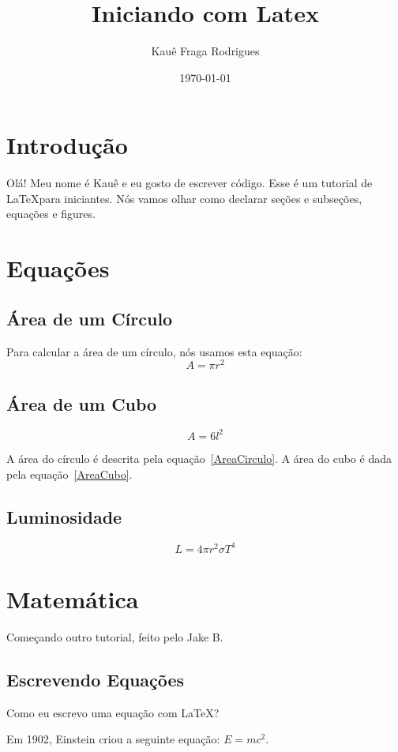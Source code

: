\documentclass[a4paper, 12pt]{article}
\title{\vspace{-3.5cm}\huge{Iniciando com Latex}}
\author{\vspace{-3mm}Kauê Fraga Rodrigues}
\date{\vspace{-0.5cm}\today}
\begin{document}
\maketitle

\section{Introdução} %
Olá! Meu nome é Kauê e eu gosto de escrever código.
Esse é um tutorial de \LaTeX para iniciantes. Nós vamos olhar como declarar
seções e subseções, equações e figures.

\section{Equações}
\subsection{Área de um Círculo}
Para calcular a área de um círculo, nós usamos esta equação:
\begin{equation}\label{AreaCirculo}
  A = \pi r^2
\end{equation}

\subsection{Área de um Cubo}
\begin{equation}\label{AreaCubo}
  A = 6 l^2
\end{equation}

A área do círculo é descrita pela equação~\ref{AreaCirculo}.
A área do cubo é dada pela equação~\ref{AreaCubo}.

\subsection{Luminosidade}
\begin{equation}\label{Luminosidade}
  L = 4 \pi r^2 \sigma T^4
\end{equation}

\newpage

\section{Matemática}
Começando outro tutorial, feito pelo Jake B.

\subsection{Escrevendo Equações}
Como eu escrevo uma equação com \LaTeX? \par
Em 1902, Einstein criou a seguinte equação: $E = mc^2$.
\end{document}
